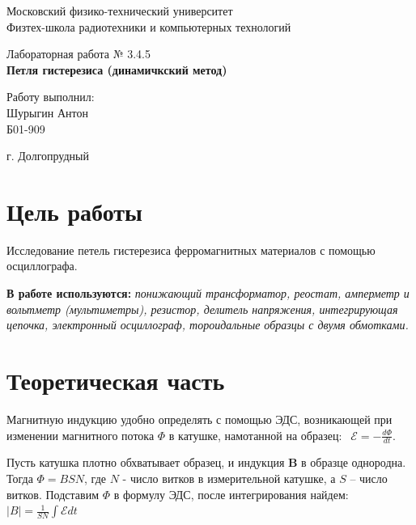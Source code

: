 \documentclass[a4paper, 14pt]{extarticle}
\date{}
\begin{document}
\begin{titlepage}
	\begin{center}
		\large 	Московский физико-технический университет \\
		Физтех-школа радиотехники и компьютерных технологий\\
		\vspace{0.2cm}
		
		\vspace{4.5cm}
		Лабораторная работа № 3.4.5 \\ \vspace{0.2cm}
		\LARGE \textbf{Петля гистерезиса (динамичкский метод)}
	\end{center}
	\vspace{2.3cm} \large
	
	\begin{center}
		Работу выполнил: \\
		Шурыгин Антон \\
		Б01-909

	\end{center}
	
	\begin{center} \vspace{60mm}
		г. Долгопрудный \\
	\end{center}
\end{titlepage}






\section{Цель работы} Исследование петель гистерезиса ферромагнитных материалов с помощью осциллографа.

\textbf{В работе используются:} \textit{понижающий трансформатор, реостат, амперметр и вольтметр (мультиметры), резистор, делитель напряжения, интегрирующая цепочка, электронный осциллограф, тороидальные образцы с двумя обмотками.}
	
\section{Теоретическая часть}		 
	Магнитную индукцию удобно определять с помощью ЭДС, возникающей при изменении магнитного потока $\Phi$ в катушке, намотанной на образец: $~~\mathscr{E}=-\frac{d\Phi}{dt}$.
	
	Пусть катушка плотно обхватывает образец, и индукция $\textbf{B}$
	в образце однородна. Тогда $\Phi=BSN$, где $N$ - число витков в измерительной катушке, а $S$ -- число витков.
	Подставим $\Phi$ в формулу ЭДС, после интегрирования найдем:
	$|B|=\frac{1}{SN}\int \mathscr{E} dt$
	
\end{document}
